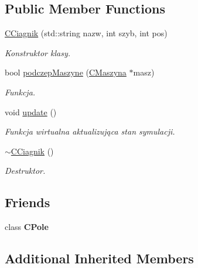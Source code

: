 \subsection*{Public Member Functions}
\begin{DoxyCompactItemize}
\item 
\mbox{\hyperlink{class_c_ciagnik_a82a94c1b3314d7cc4932b146f2716bb2}{C\+Ciagnik}} (std\+::string nazw, int szyb, int pos)
\begin{DoxyCompactList}\small\item\em Konstruktor klasy. \end{DoxyCompactList}\item 
bool \mbox{\hyperlink{class_c_ciagnik_ab4519a3434355d84543e76c37406cf62}{podczep\+Maszyne}} (\mbox{\hyperlink{class_c_maszyna}{C\+Maszyna}} $\ast$masz)
\begin{DoxyCompactList}\small\item\em Funkcja. \end{DoxyCompactList}\item 
void \mbox{\hyperlink{class_c_ciagnik_a1596597ae77f6e71919e5c17affddad1}{update}} ()
\begin{DoxyCompactList}\small\item\em Funkcja wirtualna aktualizująca stan symulacji. \end{DoxyCompactList}\item 
\mbox{\label{class_c_ciagnik_aeb82fbb94ecd856bf3f94cc0e8a87812}} 
\mbox{\hyperlink{class_c_ciagnik_aeb82fbb94ecd856bf3f94cc0e8a87812}{$\sim$\+C\+Ciagnik}} ()
\begin{DoxyCompactList}\small\item\em Destruktor. \end{DoxyCompactList}\end{DoxyCompactItemize}
\subsection*{Friends}
\begin{DoxyCompactItemize}
\item 
\mbox{\label{class_c_ciagnik_aa7baff0f917ca57920df8a09ac0982b0}} 
class {\bfseries C\+Pole}
\end{DoxyCompactItemize}
\subsection*{Additional Inherited Members}


